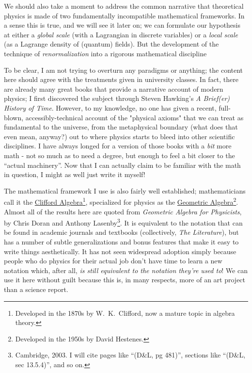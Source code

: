 We should also take a moment to address the common narrative that theoretical physics is made of two fundamentally incompatible mathematical frameworks. In a sense this is true, and we will see it later on; we can formulate our hypothesis at either a \emph{global scale} (with a Lagrangian in discrete variables) or a \emph{local scale} (as a Lagrange density of (quantum) fields). But the development of the technique of \emph{renormalization} into a rigorous mathematical discipline

To be clear, I am not trying to overturn any paradigms or anything; the content here should agree with the treatments given in university classes. In fact, there are already many great books that provide a narrative account of modern physics; I first discovered the subject through Steven Hawking's \emph{A Brief(er) History of Time}. However, to my knowledge, no one has given a recent, full-blown, accessibly-technical account of the "physical axioms" that we can treat as fundamental to the universe, from the metaphysical boundary (what does that even mean, anyway?) out to where physics starts to bleed into other scientific disciplines. I have always longed for a version of those books with a \emph{bit} more math - not so much as to need a degree, but enough to feel a bit closer to the ``actual machinery''. Now that I can actually claim to be familiar with the math in question, I might as well just write it myself!

The mathematical framework I use is also fairly well established; mathematicians call it the \href{https://en.wikipedia.org/wiki/Clifford_algebra}{Clifford Algebra}\footnote{Developed in the 1870s by W.~K.~Clifford, now a mature topic in algebra theory.}, specialized for physics as the \href{https://en.wikipedia.org/wiki/Geometric_algebra}{Geometric Algebra}\footnote{Developed in the 1950s by David Hestenes.}. Almost all of the results here are quoted from \emph{Geometric Algebra for Physicists}, by Chris Doran and Anthony Lasenby\footnote{Cambridge, 2003. I will cite pages like ``(D&L, pg 481)'', sections like ``(D&L, sec 13.5.4)'', and so on.}. It is equivalent to the notation that can be found in academic journals and textbooks (collectively, \emph{The Literature}), but has a number of subtle generalizations and bonus features that make it easy to write things aesthetically. It has not seen widespread adoption simply because people who do physics for their actual job don't have time to learn a new notation which, after all, \emph{is still equivalent to the notation they're used to}! We can use it here without guilt because this is, in many respects, more of an art project than a science report.

